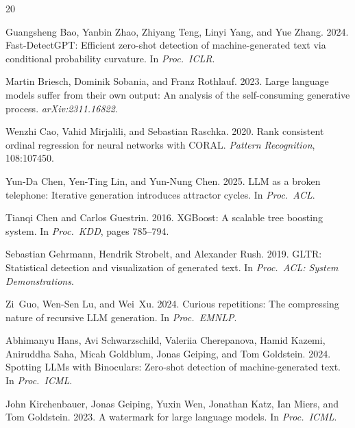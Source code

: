 \documentclass[11pt,a4paper]{article}
\begin{document}
\begin{thebibliography}{20}

Guangsheng Bao, Yanbin Zhao, Zhiyang Teng, Linyi Yang, and Yue Zhang. 2024.
\newblock Fast-DetectGPT: Efficient zero-shot detection of machine-generated text via conditional probability curvature.
\newblock In \emph{Proc.\ ICLR}.

Martin Briesch, Dominik Sobania, and Franz Rothlauf. 2023.
\newblock Large language models suffer from their own output: An analysis of the self-consuming generative process.
\newblock \emph{arXiv:2311.16822}.

Wenzhi Cao, Vahid Mirjalili, and Sebastian Raschka. 2020.
\newblock Rank consistent ordinal regression for neural networks with CORAL.
\newblock \emph{Pattern Recognition}, 108:107450.

Yun-Da Chen, Yen-Ting Lin, and Yun-Nung Chen. 2025.
\newblock LLM as a broken telephone: Iterative generation introduces attractor cycles.
\newblock In \emph{Proc.\ ACL}.

Tianqi Chen and Carlos Guestrin. 2016.
\newblock XGBoost: A scalable tree boosting system.
\newblock In \emph{Proc.\ KDD}, pages 785--794.

Sebastian Gehrmann, Hendrik Strobelt, and Alexander Rush. 2019.
\newblock GLTR: Statistical detection and visualization of generated text.
\newblock In \emph{Proc.\ ACL: System Demonstrations}.

Zi~Guo, Wen-Sen Lu, and Wei~Xu. 2024.
\newblock Curious repetitions: The compressing nature of recursive LLM generation.
\newblock In \emph{Proc.\ EMNLP}.

Abhimanyu Hans, Avi Schwarzschild, Valeriia Cherepanova, Hamid Kazemi, Aniruddha Saha, Micah Goldblum, Jonas Geiping, and Tom Goldstein. 2024.
\newblock Spotting LLMs with Binoculars: Zero-shot detection of machine-generated text.
\newblock In \emph{Proc.\ ICML}.

John Kirchenbauer, Jonas Geiping, Yuxin Wen, Jonathan Katz, Ian Miers, and Tom Goldstein. 2023.
\newblock A watermark for large language models.
\newblock In \emph{Proc.\ ICML}.


\end{thebibliography}
\end{document}
